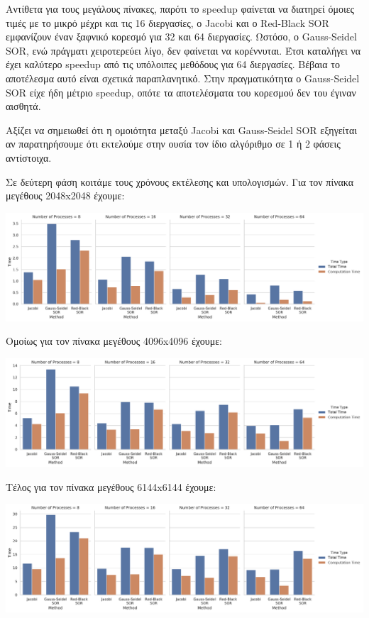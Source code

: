 \documentclass[12pt,titlepage]{article}
\begin{document}
Αντίθετα για τους μεγάλους πίνακες, παρότι το speedup φαίνεται να διατηρεί
όμοιες τιμές με το μικρό μέχρι και τις 16 διεργασίες, ο Jacobi και ο
Red-Black SOR εμφανίζουν έναν ξαφνικό κορεσμό για 32 και 64 διεργασίες.
Ωστόσο, ο Gauss-Seidel SOR, ενώ πράγματι χειροτερεύει λίγο, δεν φαίνεται να
κορέννυται. Έτσι καταλήγει να έχει καλύτερο speedup από τις υπόλοιπες
μεθόδους για 64 διεργασίες. Βέβαια το αποτέλεσμα αυτό είναι σχετικά
παραπλανητικό. Στην πραγματικότητα ο Gauss-Seidel SOR είχε ήδη μέτριο speedup,
οπότε τα αποτελέσματα του κορεσμού δεν του έγιναν αισθητά.

Αξίζει να σημειωθεί ότι η ομοιότητα μεταξύ Jacobi και Gauss-Seidel SOR εξηγείται
αν παρατηρήσουμε ότι εκτελούμε στην ουσία τον ίδιο αλγόριθμο σε 1 ή 2 φάσεις
αντίστοιχα.

Σε δεύτερη φάση κοιτάμε τους χρόνους εκτέλεσης και υπολογισμών. Για τον πίνακα
μεγέθους 2048x2048 έχουμε:

\begin{center}
    \includegraphics[width=1.15\textwidth]{time-2048x2048.pdf}
\end{center}

Ομοίως για τον πίνακα μεγέθους 4096x4096 έχουμε:

\begin{center}
    \includegraphics[width=1.15\textwidth]{time-4096x4096.pdf}
\end{center}

Τέλος για τον πίνακα μεγέθους 6144x6144 έχουμε:

\begin{center}
    \includegraphics[width=1.15\textwidth]{time-6144x6144.pdf}
\end{center}
\end{document}
